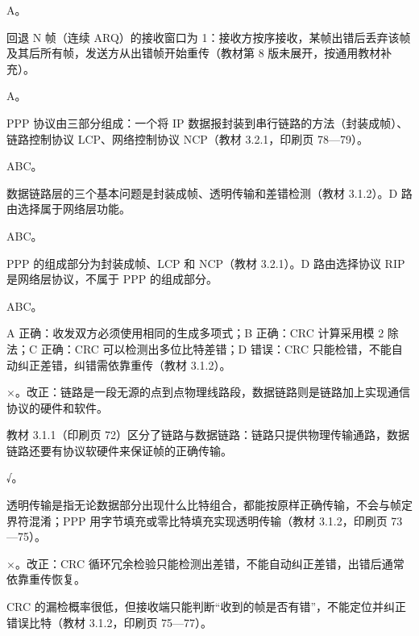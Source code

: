 \documentclass[a4paper,11pt]{article}
\begin{document}
\q A。\begin{analysis}回退 N 帧（连续 ARQ）的接收窗口为 1：接收方按序接收，某帧出错后丢弃该帧及其后所有帧，发送方从出错帧开始重传（教材第 8 版未展开，按通用教材补充）。\end{analysis}

\q A。\begin{analysis}PPP 协议由三部分组成：一个将 IP 数据报封装到串行链路的方法（封装成帧）、链路控制协议 LCP、网络控制协议 NCP（教材 3.2.1，印刷页 78—79）。\end{analysis}


\q ABC。\begin{analysis}数据链路层的三个基本问题是封装成帧、透明传输和差错检测（教材 3.1.2）。D 路由选择属于网络层功能。\end{analysis}

\q ABC。\begin{analysis}PPP 的组成部分为封装成帧、LCP 和 NCP（教材 3.2.1）。D 路由选择协议 RIP 是网络层协议，不属于 PPP 的组成部分。\end{analysis}

\q ABC。\begin{analysis}A 正确：收发双方必须使用相同的生成多项式；B 正确：CRC 计算采用模 2 除法；C 正确：CRC 可以检测出多位比特差错；D 错误：CRC 只能检错，不能自动纠正差错，纠错需依靠重传（教材 3.1.2）。\end{analysis}


\q ×。改正：链路是一段无源的点到点物理线路段，数据链路则是链路加上实现通信协议的硬件和软件。\begin{analysis}教材 3.1.1（印刷页 72）区分了链路与数据链路：链路只提供物理传输通路，数据链路还要有协议软硬件来保证帧的正确传输。\end{analysis}

\q √。\begin{analysis}透明传输是指无论数据部分出现什么比特组合，都能按原样正确传输，不会与帧定界符混淆；PPP 用字节填充或零比特填充实现透明传输（教材 3.1.2，印刷页 73—75）。\end{analysis}

\q ×。改正：CRC 循环冗余检验只能检测出差错，不能自动纠正差错，出错后通常依靠重传恢复。\begin{analysis}CRC 的漏检概率很低，但接收端只能判断“收到的帧是否有错”，不能定位并纠正错误比特（教材 3.1.2，印刷页 75—77）。\end{analysis}
\end{document}

